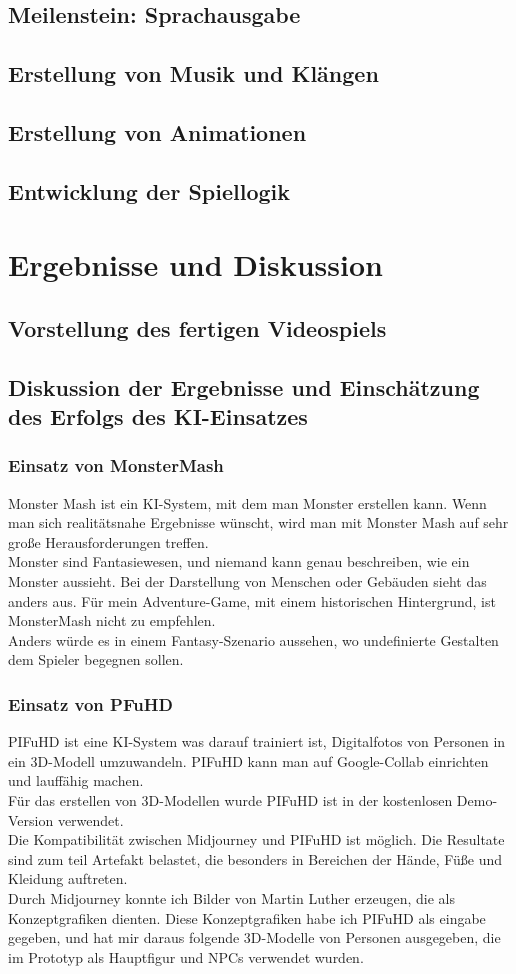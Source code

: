 \documentclass[12pt,a4paper,bibliography=totocnumbered,listof=totocnumbered]{scrartcl}
\begin{document}
\subsection {Meilenstein: Sprachausgabe}
\subsection{Erstellung von Musik und Klängen}
\subsection{Erstellung von Animationen}
\subsection{Entwicklung der Spiellogik}
\section{Ergebnisse und Diskussion}
\subsection{Vorstellung des fertigen Videospiels}
\subsection{Diskussion der Ergebnisse und Einschätzung des Erfolgs des KI-Einsatzes}
\subsubsection{Einsatz von MonsterMash}
Monster Mash ist ein KI-System, mit dem man Monster erstellen kann. Wenn man sich realitätsnahe Ergebnisse wünscht, wird man mit Monster Mash auf sehr große Herausforderungen treffen.
\\
Monster sind Fantasiewesen, und niemand kann genau beschreiben, wie ein Monster aussieht. Bei der Darstellung von Menschen oder Gebäuden sieht das anders aus. Für mein Adventure-Game, mit einem historischen Hintergrund, ist MonsterMash nicht zu empfehlen.
\\
Anders würde es in einem Fantasy-Szenario aussehen, wo undefinierte Gestalten dem Spieler begegnen sollen.
\subsubsection{Einsatz von PFuHD}
PIFuHD ist eine KI-System was darauf trainiert ist, Digitalfotos von Personen in ein 3D-Modell umzuwandeln. PIFuHD kann man auf Google-Collab einrichten und lauffähig machen.
\\
Für das erstellen von 3D-Modellen wurde PIFuHD ist in der kostenlosen Demo-Version verwendet.
\\
Die Kompatibilität zwischen Midjourney und PIFuHD ist möglich. Die Resultate sind zum teil Artefakt belastet, die besonders in Bereichen der Hände, Füße und Kleidung auftreten.
\\
Durch Midjourney konnte ich Bilder von Martin Luther erzeugen, die als Konzeptgrafiken dienten. Diese Konzeptgrafiken habe ich PIFuHD als eingabe gegeben, und hat mir daraus folgende 3D-Modelle von Personen ausgegeben, die im Prototyp als Hauptfigur und NPCs verwendet wurden.
\end{document}

